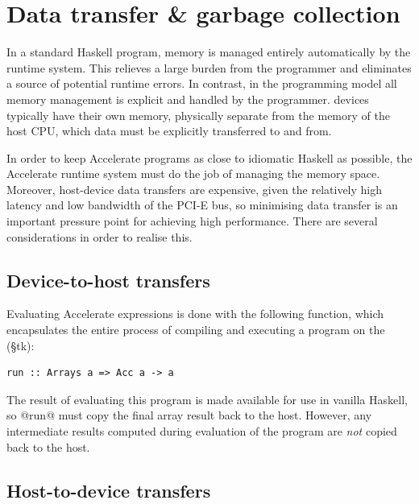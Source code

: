\section{Data transfer \& garbage collection}
\label{sec:memory_management}

In a standard Haskell program, memory is managed entirely automatically by the
runtime system. This relieves a large burden from the programmer and eliminates
a source of potential runtime errors. In contrast, in the \CUDA programming model
all memory management is explicit and handled by the programmer. \CUDA devices
typically have their own memory, physically separate from the memory of the host
CPU, which data must be explicitly transferred to and from.

In order to keep Accelerate programs as close to idiomatic Haskell as possible,
the Accelerate runtime system must do the job of managing the \CUDA memory
space. Moreover, host-device data transfers are expensive, given the relatively
high latency and low bandwidth of the PCI-E bus, so minimising data transfer is
an important pressure point for achieving high performance. There are several
considerations in order to realise this.



\subsection{Device-to-host transfers}

Evaluating Accelerate expressions is done with the following function, which
encapsulates the entire process of compiling and executing a program on the
\GPU (\S tk):
%
\begin{lstlisting}[style=haskell,numbers=none]
    run :: Arrays a => Acc a -> a
\end{lstlisting}
%
The result of evaluating this program is made available for use in vanilla
Haskell, so @run@ must copy the final array result back to the host.
However, any intermediate results computed during evaluation of the program are
\emph{not} copied back to the host.


\subsection{Host-to-device transfers}
\label{sec:host_device_transfers}

